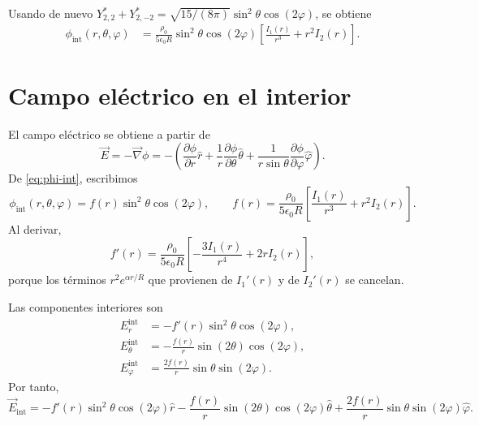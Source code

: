 \documentclass[a4paper,12pt]{article}
\begin{document}
Usando de nuevo $Y_{2,2}^*+Y_{2,-2}^*=\sqrt{15/(8\pi)}\sin^2\theta\cos(2\varphi)$, se obtiene
\begin{equation}
\label{eq:phi-int}
\boxed{
\begin{aligned}
\phi_{\mathrm{int}}(r,\theta,\varphi)
&=\frac{\rho_0}{5\epsilon_0R}\sin^2\theta\cos(2\varphi)
\left[\frac{I_1(r)}{r^3}+r^2I_2(r)\right].
\end{aligned}}
\end{equation}

\section{Campo eléctrico en el interior}

\begin{center}
\end{center}

El campo eléctrico se obtiene a partir de
\[
\vec E=-\vec\nabla\phi
=-\left(\frac{\partial\phi}{\partial r}\hat r
+\frac{1}{r}\frac{\partial\phi}{\partial\theta}\hat\theta
+\frac{1}{r\sin\theta}\frac{\partial\phi}{\partial\varphi}\hat\varphi\right).
\]
De \eqref{eq:phi-int}, escribimos
\[
\phi_{\mathrm{int}}(r,\theta,\varphi)=f(r)\sin^2\theta\cos(2\varphi),
\qquad
f(r)=\frac{\rho_0}{5\epsilon_0R}\left[\frac{I_1(r)}{r^3}+r^2I_2(r)\right].
\]
Al derivar,
\[
f'(r)=\frac{\rho_0}{5\epsilon_0R}\left[-\frac{3I_1(r)}{r^4}+2rI_2(r)\right],
\]
porque los términos $r^2e^{\alpha r/R}$ que provienen de $I_1'(r)$ y de $I_2'(r)$ se cancelan.

Las componentes interiores son
\begin{align*}
E_r^{\mathrm{int}}&=-f'(r)\sin^2\theta\cos(2\varphi),\\
E_\theta^{\mathrm{int}}&=-\frac{f(r)}{r}\sin(2\theta)\cos(2\varphi),\\
E_\varphi^{\mathrm{int}}&=\frac{2f(r)}{r}\sin\theta\sin(2\varphi).
\end{align*}
Por tanto,
\begin{equation}
\label{eq:e-int}
\boxed{
\vec E_{\mathrm{int}}
=-f'(r)\sin^2\theta\cos(2\varphi)\hat r
-\frac{f(r)}{r}\sin(2\theta)\cos(2\varphi)\hat\theta
+\frac{2f(r)}{r}\sin\theta\sin(2\varphi)\hat\varphi.}
\end{equation}
\end{document}
